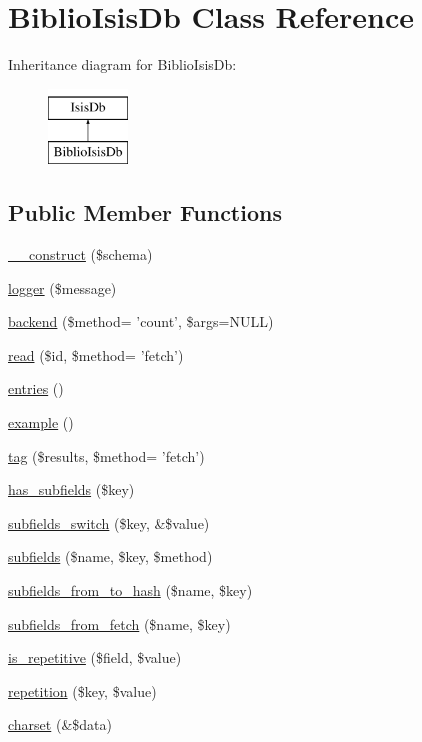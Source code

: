 \hypertarget{classBiblioIsisDb}{
\section{BiblioIsisDb Class Reference}
\label{classBiblioIsisDb}
}
Inheritance diagram for BiblioIsisDb:\begin{figure}[H]
\begin{center}
\leavevmode
\includegraphics[height=2cm]{classBiblioIsisDb}
\end{center}
\end{figure}
\subsection*{Public Member Functions}
\begin{DoxyCompactItemize}
\item 
\hyperlink{classBiblioIsisDb_ab2c5ec782b324847e104d8ad35a230af}{\_\-\_\-construct} (\$schema)
\item 
\hyperlink{classBiblioIsisDb_a286fb16de5797785d28021068efca561}{logger} (\$message)
\item 
\hyperlink{classBiblioIsisDb_ad5704f5c9454ac053e66a489797ba221}{backend} (\$method= 'count', \$args=NULL)
\item 
\hyperlink{classBiblioIsisDb_a808cdbc0d4c8f62a1465e74064f4422f}{read} (\$id, \$method= 'fetch')
\item 
\hyperlink{classBiblioIsisDb_ab6b0a977c066c25c6bdca5c1d3a083e8}{entries} ()
\item 
\hyperlink{classBiblioIsisDb_a8e76b289b9e3a9893b9469094753d2bc}{example} ()
\item 
\hyperlink{classBiblioIsisDb_a34483b463d81ba1d8031576b5735efbc}{tag} (\$results, \$method= 'fetch')
\item 
\hyperlink{classBiblioIsisDb_a73d5d998f9ab7e410c5f71f65e83948b}{has\_\-subfields} (\$key)
\item 
\hyperlink{classBiblioIsisDb_af0be305b211b96dcb4aeb8452c8331a9}{subfields\_\-switch} (\$key, \&\$value)
\item 
\hyperlink{classBiblioIsisDb_a450e26ae0b7f4967d8e25c9a3d023c75}{subfields} (\$name, \$key, \$method)
\item 
\hyperlink{classBiblioIsisDb_a8c6a0081c5296a6db520e98998502ef7}{subfields\_\-from\_\-to\_\-hash} (\$name, \$key)
\item 
\hyperlink{classBiblioIsisDb_a2b08c6a7ba20f6f5eb07edb2b4a914c1}{subfields\_\-from\_\-fetch} (\$name, \$key)
\item 
\hyperlink{classBiblioIsisDb_aa86380f9e66ea8f175c50675d1fe0a88}{is\_\-repetitive} (\$field, \$value)
\item 
\hyperlink{classBiblioIsisDb_a04089d61ce04b18aa6a78c94ca02edb9}{repetition} (\$key, \$value)
\item 
\hyperlink{classBiblioIsisDb_a2b6fd7b7316f63ac5649ebf3947c4fae}{charset} (\&\$data)
\end{DoxyCompactItemize}
